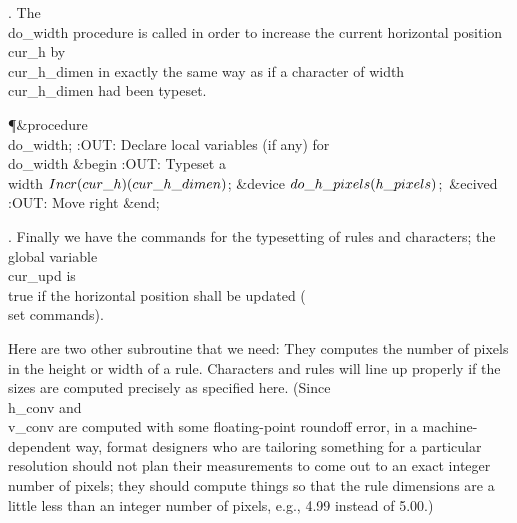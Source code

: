 . The \\{do\_width} procedure is called in order to increase the current
horizontal position \\{cur\_h} by \\{cur\_h\_dimen} in exactly the same way
as if a character of width \\{cur\_h\_dimen} had been typeset.

\Y\P\4\&{procedure}\1\  \\{do\_width};\6
:OUT: Declare local variables (if any) for \\{do\_width}\X\2\6
\&{begin} :OUT: Typeset a \\{width}\X\6
$\\{Incr}(\\{cur\_h})(\\{cur\_h\_dimen})$;\6
\&{device} $\\{do\_h\_pixels}(\\{h\_pixels})$;\ \&{ecived}\6
:OUT: Move right\X\6
\&{end};\par
\fi

. Finally we have the commands for the typesetting of rules and
characters;
the global variable \\{cur\_upd} is \\{true} if the horizontal position shall
be updated (\\{set} commands).

Here are two other subroutine that we need: They computes the number of
pixels in the height or width of a rule. Characters and rules will line up
properly if the sizes are computed precisely as specified here.  (Since
\\{h\_conv} and \\{v\_conv} are computed with some floating-point roundoff
error,
in a machine-dependent way, format designers who are tailoring something for
a particular resolution should not plan their measurements to come out to an
exact integer number of pixels; they should compute things so that the
rule dimensions are a little less than an integer number of pixels, e.g.,
4.99 instead of 5.00.)

